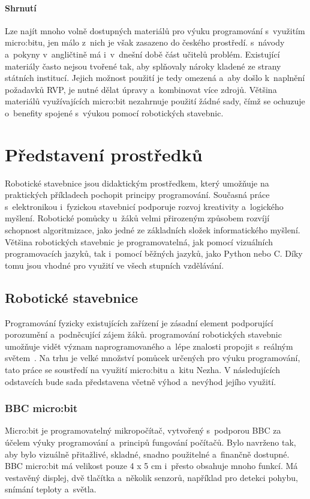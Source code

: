 \documentclass[
  digital,     %
  oneside,     %
  nosansbold,  %
  colorbold, %
  lof,         %
  nolot,         %
]{fithesis4}
\begin{document}
\subsubsection{Shrnutí}
Lze najít mnoho volně dostupných materiálů pro výuku programování s~využitím micro:bitu, jen málo z~nich je však zasazeno do českého prostředí. s~návody a~pokyny v~angličtině má i~v~dnešní době část učitelů problém. Existující materiály často nejsou tvořené tak, aby splňovaly nároky kladené ze strany státních institucí. Jejich možnost použití je tedy omezená a~aby došlo k~naplnění požadavků RVP, je nutné dělat úpravy a~kombinovat více zdrojů. Většina materiálů využívajících micro:bit nezahrnuje použití žádné sady, čímž se ochuzuje o~benefity spojené s~výukou pomocí robotických stavebnic.

\chapter{Představení prostředků}
Robotické stavebnice jsou didaktickým prostředkem, který umožňuje na praktických příkladech pochopit principy programování. Současná práce s~elektronikou i~fyzickou stavebnicí podporuje rozvoj kreativity a~logického myšlení. Robotické pomůcky u~žáků velmi přirozeným způsobem rozvíjí schopnost algoritmizace, jako jedné ze základních složek informatického myšlení. Většina robotických stavebnic je programovatelná, jak pomocí vizuálních programovacích jazyků, tak i~pomocí běžných jazyků, jako Python nebo C. Díky tomu jsou vhodné pro využití ve všech stupních vzdělávání. 

\section{Robotické stavebnice}
Programování fyzicky existujících zařízení je zásadní element podporující porozumění a~podněcující zájem žáků. programování robotických stavebnic umožňuje vidět význam naprogramovaného a~lépe znalosti propojit s~reálným světem~\cite{Sentance17}. Na trhu je velké množství pomůcek určených pro výuku programování, tato práce se soustředí na využití micro:bitu a~kitu Nezha.
V následujících odstavcích bude sada představena včetně výhod a~nevýhod jejího využití. 

\subsection{BBC micro:bit}
Micro:bit je programovatelný mikropočítač, vytvořený s~podporou BBC za účelem výuky programování a~principů fungování počítačů. Bylo navrženo tak, aby bylo vizuálně přitažlivé, skladné, snadno použitelné a~finančně dostupné. BBC micro:bit má velikost pouze 4 x 5 cm i~přesto obsahuje mnoho funkcí.  Má vestavěný displej, dvě tlačítka a~několik senzorů, například pro detekci pohybu, snímání teploty a~světla. 
\end{document}
